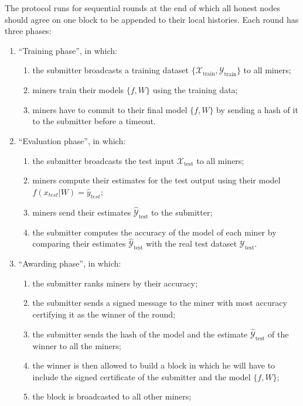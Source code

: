 \documentclass[conference]{IEEEtran}
\begin{document}
The protocol runs for sequential rounds at the end of which all honest nodes should agree on one block to be appended to their local histories. Each round has three phases:
\begin{enumerate}
    \item ``Training phase'', in which:
    \begin{enumerate}
        \item the submitter broadcasts a training dataset $\{\mathcal X_\text{train},\mathcal Y_\text{train}\}$ to all miners;
        \item miners train their models $\{f,W\}$ using the training data;
        \item miners have to commit to their final model $\{f,W\}$ by sending a hash of it to the submitter before a timeout.
    \end{enumerate}
    \item ``Evaluation phase'', in which:
    \begin{enumerate}
        \item the submitter broadcasts the test input $\mathcal X_\text{test}$ to all miners;
        \item miners compute their estimates for the test output using their model $f(x_{test}|W)=\hat y_{test}$;
        \item miners send their estimates $\hat{\mathcal Y}_{\text{test}}$ to the submitter;
        \item the submitter computes the accuracy of the model of each miner by comparing their estimates $\hat{\mathcal Y}_{\text{test}}$ with the real test dataset $\mathcal Y_{\text{test}}$.
    \end{enumerate}
    \item ``Awarding phase'', in which:
    \begin{enumerate}
        \item the submitter ranks miners by their accuracy;
        \item the submitter sends a signed message to the miner with most accuracy certifying it as the winner of the round;
        \item the submitter sends the hash of the model and the estimate $\hat{\mathcal Y}_{\text{test}}$ of the winner to all the miners;
        \item the winner is then allowed to build a block in which he will have to include the signed certificate of the submitter and the model $\{f,W\}$;
        \item the block is broadcasted to all other miners;

\end{enumerate}
\end{enumerate}
\end{document}
